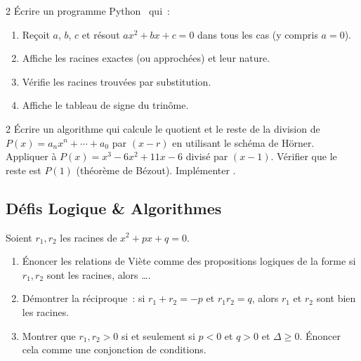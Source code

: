 \begin{bilan}
\begin{probleme}{2}
\'Ecrire un programme Python \computer\ qui~:
\begin{enumerate}
  \item Re\c coit $a$, $b$, $c$ et r\'esout $ax^2+bx+c=0$ dans tous les cas
        (y compris $a=0$).
  \item Affiche les racines exactes (ou approch\'ees) et leur nature.
  \item V\'erifie les racines trouv\'ees par substitution.
  \item Affiche le tableau de signe du trin\^ome.
\end{enumerate}
\end{probleme}

\begin{probleme}{2}
\'Ecrire un algorithme qui calcule le quotient et le reste
de la division de $P(x)=a_nx^n+\cdots+a_0$ par $(x-r)$
en utilisant le sch\'ema de H\"orner.
Appliquer \`a $P(x)=x^3-6x^2+11x-6$ divis\'e par $(x-1)$.
V\'erifier que le reste est $P(1)$ (th\'eor\`eme de B\'ezout).
Impl\'ementer \computer.
\end{probleme}

\subsection*{D\'efis Logique \& Algorithmes}

\begin{challenge}
Soient $r_1,r_2$ les racines de $x^2+px+q=0$.
\begin{enumerate}
  \item \'Enoncer les relations de Vi\`ete comme des propositions logiques
        de la forme \og si $r_1,r_2$ sont les racines, alors \ldots\fg.
  \item D\'emontrer la r\'eciproque~: si $r_1+r_2=-p$ et $r_1r_2=q$,
        alors $r_1$ et $r_2$ sont bien les racines.
  \item Montrer que $r_1,r_2>0$ si et seulement si $p<0$ et $q>0$ et $\Delta\geq0$.
        \'Enoncer cela comme une conjonction de conditions.
\end{enumerate}
\end{challenge}


\end{bilan}
